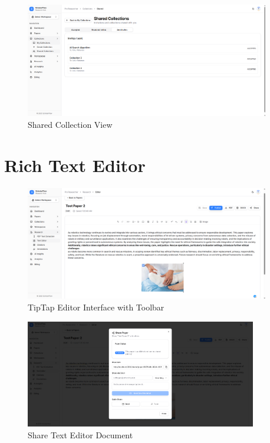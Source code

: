 \begin{figure}[H]
\centering
\includegraphics[width=0.95\textwidth]{images/screenshots/shared_collection.png}
\caption{Shared Collection View}
\label{fig:screenshot-shared-collection}
\end{figure}

\section{Rich Text Editor}
\label{sec:screenshots-editor}

\begin{figure}[H]
\centering
\includegraphics[width=0.95\textwidth]{images/screenshots/text_editor.png}
\caption{TipTap Editor Interface with Toolbar}
\label{fig:screenshot-text-editor}
\end{figure}

\begin{figure}[H]
\centering
\includegraphics[width=0.9\textwidth]{images/screenshots/share_text_editor.png}
\caption{Share Text Editor Document}
\label{fig:screenshot-share-editor}
\end{figure}

